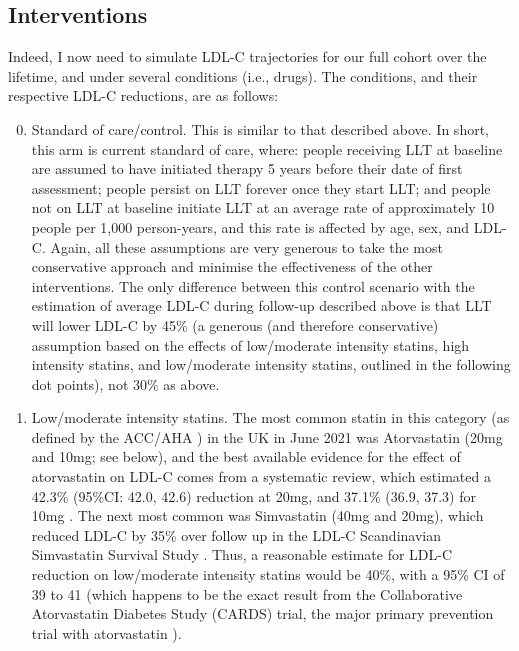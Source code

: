 \documentclass[11pt]{article}
\begin{document}
\color{Blue4}
\begin{stlog}\end{stlog}
\color{black}

\subsection{Interventions}

Indeed, I now need to simulate LDL-C trajectories for our full cohort over the lifetime, and under several conditions (i.e., drugs).
The conditions, and their respective LDL-C reductions, are as follows:
\begin{enumerate}
\setcounter{enumi}{-1}
\item Standard of care/control. This is similar to that described above. In short, this arm is current standard of care, 
where: people receiving LLT at baseline are assumed to have initiated therapy 5 years before their date of first assessment;
people persist on LLT forever once they start LLT; and
people not on LLT at baseline initiate LLT at an average rate of approximately 10 people per 1,000 person-years,
and this rate is affected by age, sex, and LDL-C. Again, all these assumptions are very generous to take the 
most conservative approach and minimise the effectiveness of the other interventions. 
The only difference between this control scenario with the estimation of average LDL-C during follow-up described above 
is that LLT will lower LDL-C by 45\% (a generous (and therefore conservative) assumption based on the effects of low/moderate intensity statins, 
high intensity statins, and low/moderate intensity statins, outlined in the following dot points), not 30\% as above.
\item Low/moderate intensity statins. The most common statin in this category (as defined by the ACC/AHA \cite{StoneJACC2014}) 
in the UK in June 2021 was Atorvastatin (20mg and 10mg; see below), and the best available evidence for the effect of atorvastatin on 
LDL-C comes from a systematic review, which estimated a 42.3\% (95\%CI: 42.0, 42.6) reduction at 20mg, and 37.1\% (36.9, 37.3) for 10mg
\cite{AdamsCDSR2015}. 
The next most common was Simvastatin (40mg and 20mg), which reduced LDL-C by 35\% over follow up in the  LDL-C 
Scandinavian Simvastatin Survival Study \cite{4SLancet1994}. Thus, a reasonable estimate for LDL-C reduction on low/moderate intensity statins
would be 40\%, with a 95\% CI of 39 to 41 (which happens to be the exact result from the 
Collaborative Atorvastatin Diabetes Study (CARDS) trial, the major primary prevention trial with atorvastatin \cite{ColhounLancet2004}). 

\end{enumerate}
\end{document}
